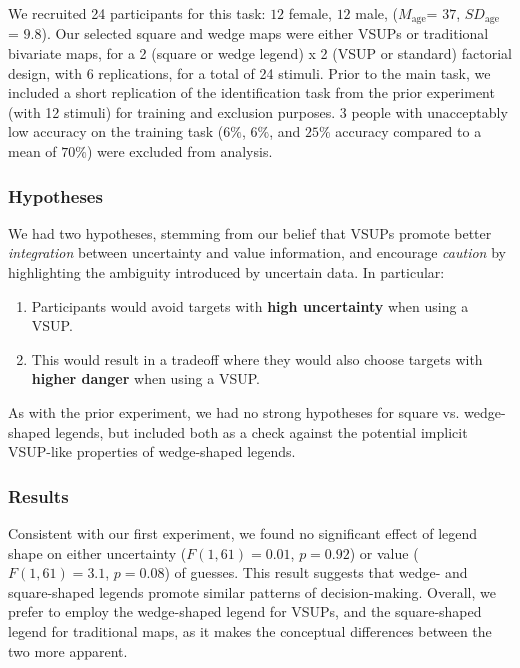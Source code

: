  We recruited 24 participants for this task: $12$ female, $12$ male, ($M_{\text{age}}$= $37$, $SD_{\text{age}}$ = $9.8$). Our selected square and wedge maps were either VSUPs or traditional bivariate maps, for a 2 (square or wedge legend) x 2 (VSUP or standard) factorial design, with 6 replications, for a total of 24 stimuli. Prior to the main task, we included a short replication of the identification task from the prior experiment (with 12 stimuli) for training and exclusion purposes. 3 people with unacceptably low accuracy on the training task ($6\%$, $6\%$, and $25\%$ accuracy compared to a mean of $70\%$) were excluded from analysis. 

\subsubsection{Hypotheses}

We had two hypotheses, stemming from our belief that VSUPs promote better \emph{integration} between uncertainty and value information, and encourage \emph{caution} by highlighting the ambiguity introduced by uncertain data. In particular:
\begin{enumerate}
	\item Participants would avoid targets with \textbf{high uncertainty} when using a VSUP.
	\item This would result in a tradeoff where they would also choose targets with \textbf{higher danger} when using a VSUP.
\end{enumerate}

As with the prior experiment, we had no strong hypotheses for square vs. wedge-shaped legends, but included both as a check against the potential implicit VSUP-like properties of wedge-shaped legends.

\subsubsection{Results} 
\taskTwoHeatmap

Consistent with our first experiment, we found no significant effect of legend shape on either uncertainty ($F(1,61) = 0.01$, $p=0.92$) or value ($F(1,61)=3.1$, $p=0.08$) of guesses. This result suggests that wedge- and square-shaped legends promote similar patterns of decision-making. Overall, we prefer to employ the wedge-shaped legend for VSUPs, and the square-shaped legend for traditional maps, as it makes the conceptual differences between the two more apparent.


